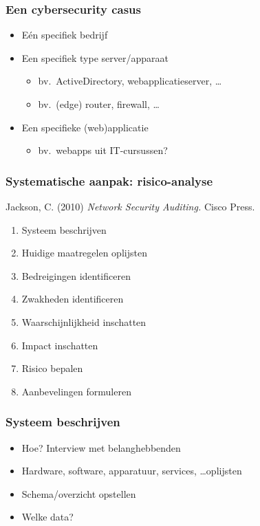 \documentclass[aspectratio=169]{beamer}
\begin{document}
\begin{frame}
  \frametitle{Een cybersecurity casus}

  \begin{itemize}
    \item Eén specifiek bedrijf
    \item Een specifiek type server/apparaat
      \begin{itemize}
        \item bv.\ ActiveDirectory, webapplicatieserver, \ldots
        \item bv.\ (edge) router, firewall, \ldots
      \end{itemize}
    \item Een specifieke (web)applicatie
      \begin{itemize}
        \item bv.\ webapps uit IT-cursussen?
      \end{itemize}
  \end{itemize}

\end{frame}

\begin{frame}
  \frametitle{Systematische aanpak: risico-analyse}

  Jackson, C. (2010) \textit{Network Security Auditing.} Cisco Press.

  \begin{enumerate}
    \item Systeem beschrijven
    \item Huidige maatregelen oplijsten
    \item Bedreigingen identificeren
    \item Zwakheden identificeren
    \item Waarschijnlijkheid inschatten
    \item Impact inschatten
    \item Risico bepalen
    \item Aanbevelingen formuleren
  \end{enumerate}

\end{frame}

\begin{frame}
  \frametitle{Systeem beschrijven}

  \begin{itemize}
    \item Hoe? Interview met belanghebbenden
    \item Hardware, software, apparatuur, services, \ldots oplijsten
    \item Schema/overzicht opstellen
    \item Welke data?
  \end{itemize}

\end{frame}
\end{document}
